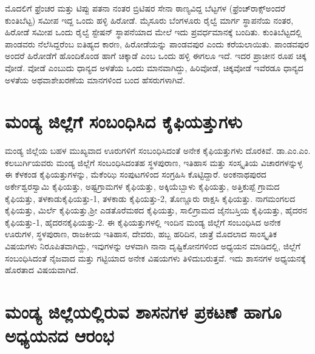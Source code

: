 ಮೊದಲಿಗೆ ಫ್ರೆಂಚರ ಮತ್ತು ಟಿಪ್ಪು ಪತನಾ ನಂತರ ಬ್ರಿಟಿಷರ ಸೇನಾ ಠಾಣ್ಯವಿದ್ದ ಬೆಟ್ಟಗಳ (ಫ್ರೆಂಚ್​ರಾಕ್ಸ್​ ಅಂದರೆ ಕುಂತಿಬೆಟ್ಟ) ಸಮೀಪ ಇದ್ದ ಒಂದು ಹಳ್ಳಿ ಹಿರೋಡೆ. ಮೈಸೂರು ಬೆಂಗಳೂರು ರೈಲ್ವೆ ಮಾರ್ಗ ಸ್ಥಾಪನೆಯ ನಂತರ, ಹಿರೋಡೆ ಸಮೀಪ ಒಂದು ರೈಲ್ವೆ ಸ್ಟೇಷನ್​ ಸ್ಥಾಪನೆಯಾದ ಮೇಲೆ ಇದು ಪ್ರವರ್ಧಮಾನಕ್ಕೆ ಬಂದಿತು. ಕುಂತಿಬೆಟ್ಟದಲ್ಲಿ ಪಾಂಡವರು ನೆಲೆಸಿದ್ದರೆಂಬ ಐತಿಹ್ಯದ ಕಾರಣ, ಹಿರೋಡೆಯನ್ನು ಪಾಂಡವಪುರ ಎಂದು ಕರೆಯಲಾಯಿತು. ಪಾಂಡವಪುರ ಅಂದರೆ ಹಿರೋಡೆಗೆ ಹೊಂದಿಕೊಂಡ ಹಾಗೆ ಚಿಕ್ಕಾಡೆ ಎಂಬ ಒಂದು ಹಳ್ಳಿ ಈಗಲೂ ಇದೆ. ಇದರ ಪ್ರಾಚೀನ ರೂಪ ಚಿಕ್ಕ ವೋಡೆ. ವೋಡೆ ಎಂಬುದು ಧಾನ್ಯದ ಅಳತೆಯ ಒಂದು ಮಾನವಾಗಿದ್ದು, ಹಿರಿವೋಡೆ, ಚಿಕ್ಕವೋಡೆ ಇವೆರಡೂ ಧಾನ್ಯದ ಅಳತೆಯ ಅಥವಾ\break ಶೇಖರಣೆಯ ಮಾನಗಳಿಂದ ಬಂದ ಹೆಸರುಗಳಾಗಿವೆ.


\section*{ಮಂಡ್ಯ ಜಿಲ್ಲೆಗೆ ಸಂಬಂಧಿಸಿದ ಕೈಫಿಯತ್ತುಗಳು}

ಮಂಡ್ಯ ಜಿಲ್ಲೆಯ ಬಹಳ ಮುಖ್ಯವಾದ ಊರುಗಳಿಗೆ ಸಂಬಂಧಿಸಿದಂತೆ ಅನೇಕ ಕೈಫಿಯತ್ತುಗಳು ದೊರಕಿವೆ. ಡಾ.ಎಂ.ಎಂ. ಕಲಬುರ್ಗಿಯವರು ಮಂಡ್ಯ ಜಿಲ್ಲೆಗೆ ಸಂಬಂಧಿಸಿದಂತಹ ಸ್ಥಳಪುರಾಣ, ಇತಿಹಾಸ ಮತ್ತು ಸಂಸ್ಕೃತಿಯ ವಿಚಾರಗಳನ್ನುಳ್ಳ ಈ ಕೆಳಕಂಡ ಕೈಫಿಯತ್ತುಗಳನ್ನು, ಮೆಕೆಂಝಿ ಸಂಪುಟಗಳಿಂದ ಸಂಗ್ರಹಿಸಿ ಕೊಟ್ಟಿದ್ದಾರೆ. ಅಂಕನಾಥಪುರದ ಅರ್ಕೇಶ್ವರಸ್ವಾಮಿ ಕೈಫಿಯತ್ತು, ಅಷ್ಟಗ್ರಾಮಗಳ ಕೈಫಿಯತ್ತು, ಅಕ್ಕಿಯೆಬ್ಬಾಳು ಕೈಫಿಯತ್ತು, ಅತ್ತಿಕುಪ್ಪೆ ಗ್ರಾಮದ ಕೈಫಿಯತ್ತು, ತಳಕಾಡು\break ಕೈಫಿಯತ್ತು-1, ತಳಕಾಡು ಕೈಫಿಯತ್ತು-2, ತೊಣ್ಣೂರು ರಾಕ್ಷಸಿ ಕೈಫಿಯತ್ತು. ನಾಗಮಂಗಲದ ಕೈಫಿಯತ್ತು, ಮಿರ್ಲೆ ಕೈಫಿಯತ್ತು,\break ಶ‍್ರೀ ಎಡತೊರೆಮಠದ ಕೈಫಿಯತ್ತು, ಸಾಲಿಗ್ರಾಮದ ಜೈನಬಸ್ತಿಯ ಕೈಫಿಯತ್ತು, ಹೈದರನ ಕೈಫಿಯತ್ತು-1, ಹೈದರನ\break ಕೈಫಿಯತ್ತು-2. ಈ ಕೈಫಿಯತ್ತುಗಳಲ್ಲಿ ಇಂದಿನ ಮಂಡ್ಯ ಜಿಲ್ಲೆಗೆ ಸಂಬಂಧಿಸಿದ ಅನೇಕ ಊರುಗಳ, ಸ್ಥಳಪುರಾಣ, ರಾಜಕೀಯ ಇತಿಹಾಸ, ದೇವರು, ಹಬ್ಬ ಹರಿದಿನ, ಜಾತ್ರೆ ಮೊದಲಾದ ಸಾಂಸ್ಕೃತಿಕ ವಿಷಯಗಳು ನಿರೂಪಿತವಾಗಿದ್ದು, ಇವುಗಳನ್ನು ಆಳವಾಗಿ ನಾನಾ ದೃಷ್ಟಿಕೋನಗಳಿಂದ ಅಧ್ಯಯನ ಮಾಡಿದಲ್ಲಿ, ಜಿಲ್ಲೆಗೆ ಸಂಬಂಧಿಸಿದಂತೆ ನೈಜವಾದ ಮತ್ತು ಗಟ್ಟಿಯಾದ ಅನೇಕ ವಿಷಯಗಳು ತಿಳಿದುಬರುತ್ತವೆ. ಇದು ಶಾಸನಗಳ ಅಧ್ಯಯನಕ್ಕೆ ಹೊರತಾದ ವಿಷಯವಾಗಿದೆ.

\section*{ಮಂಡ್ಯ ಜಿಲ್ಲೆಯಲ್ಲಿರುವ ಶಾಸನಗಳ ಪ್ರಕಟಣೆ ಹಾಗೂ ಅಧ್ಯಯನದ ಆರಂಭ}

